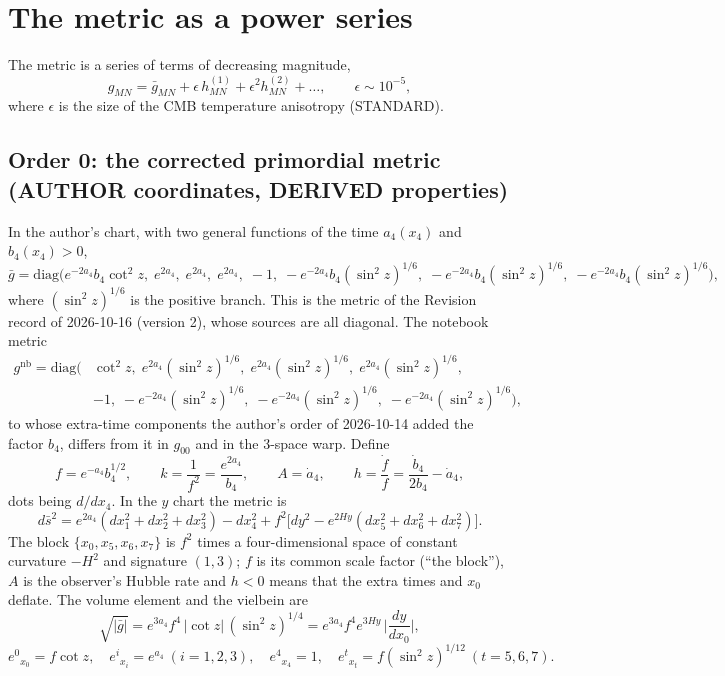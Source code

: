 \documentclass[
  10pt,
]{article}
\begin{document}
\hypertarget{the-metric-as-a-power-series}{%
\section{The metric as a power
series}\label{the-metric-as-a-power-series}}

The metric is a series of terms of decreasing magnitude,
\[ g_{MN} = \bar g_{MN} + \epsilon\, h^{(1)}_{MN} + \epsilon^2 h^{(2)}_{MN} + \dots, \qquad \epsilon \sim 10^{-5}, \]
where \(\epsilon\) is the size of the CMB temperature anisotropy
(STANDARD).

\hypertarget{order-0-the-corrected-primordial-metric-author-coordinates-derived-properties}{%
\subsection{Order 0: the corrected primordial metric (AUTHOR
coordinates, DERIVED
properties)}\label{order-0-the-corrected-primordial-metric-author-coordinates-derived-properties}}

In the author's chart, with two general functions of the time
\(a_4(x_4)\) and \(b_4(x_4) > 0\),
\[ \bar g = \mathrm{diag}\Big( e^{-2a_4} b_4 \cot^2 z,\; e^{2a_4},\; e^{2a_4},\; e^{2a_4},\; -1,\;
   -e^{-2a_4} b_4 (\sin^2 z)^{1/6},\; -e^{-2a_4} b_4 (\sin^2 z)^{1/6},\; -e^{-2a_4} b_4 (\sin^2 z)^{1/6} \Big), \]
where \((\sin^2 z)^{1/6}\) is the positive branch. This is the metric of
the Revision record of 2026-10-16 (version 2), whose sources are all
diagonal. The notebook metric
\[ \begin{aligned} g^{\text{nb}} = \mathrm{diag}\big(&\cot^2 z,\; e^{2a_4}(\sin^2z)^{1/6},\; e^{2a_4}(\sin^2z)^{1/6},\; e^{2a_4}(\sin^2z)^{1/6},\\
   &-1,\; -e^{-2a_4}(\sin^2z)^{1/6},\; -e^{-2a_4}(\sin^2z)^{1/6},\; -e^{-2a_4}(\sin^2z)^{1/6}\big), \end{aligned} \]
to whose extra-time components the author's order of 2026-10-14 added
the factor \(b_4\), differs from it in \(g_{00}\) and in the 3-space
warp. Define
\[ f = e^{-a_4} b_4^{1/2}, \qquad k = \frac{1}{f^2} = \frac{e^{2a_4}}{b_4}, \qquad A = \dot a_4, \qquad h = \frac{\dot f}{f} = \frac{\dot b_4}{2b_4} - \dot a_4 , \]
dots being \(d/dx_4\). In the \(y\) chart the metric is
\[ d\bar s^2 = e^{2a_4}(dx_1^2 + dx_2^2 + dx_3^2) - dx_4^2 + f^2\big[dy^2 - e^{2Hy}(dx_5^2 + dx_6^2 + dx_7^2)\big] .\]
The block \(\{x_0, x_5, x_6, x_7\}\) is \(f^2\) times a four-dimensional
space of constant curvature \(-H^2\) and signature \((1,3)\); \(f\) is
its common scale factor (``the block''), \(A\) is the observer's Hubble
rate and \(h < 0\) means that the extra times and \(x_0\) deflate. The
volume element and the vielbein are
\[ \sqrt{|\bar g|} = e^{3a_4} f^4\, |\cot z|\,(\sin^2 z)^{1/4} = e^{3a_4} f^4 e^{3Hy}\,\Big|\frac{dy}{dx_0}\Big| ,\]
\[ e^0{}_{x_0} = f\cot z,\quad e^i{}_{x_i} = e^{a_4}\ (i = 1,2,3),\quad e^4{}_{x_4} = 1,\quad e^t{}_{x_t} = f(\sin^2 z)^{1/12}\ (t = 5,6,7) .\]
\end{document}
